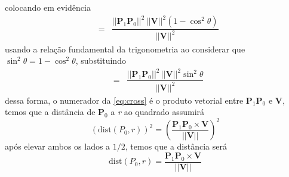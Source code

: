 \documentclass[a4paper, 12pt, brazilian]{article}
\newcommand{\vect}{\bm{P}_{1}\bm{P}_{0}}
\begin{document}
	colocando em evidência
	\begin{eqnarray}
		&=&\dfrac{||\vect||^{2}\,||\bm{V}||^{2}(1-\cos^{2}\theta)}{||\bm{V}||^{2}}
	\end{eqnarray}
	usando a relação fundamental da trigonometria ao considerar que $\sin^{2}\theta=1-\cos^{2}\theta$, substituindo
	\begin{eqnarray}
		\label{eq:cross}
		&=&\dfrac{||\vect||^{2}\,||\bm{V}||^{2}\sin^{2}\theta}{||\bm{V}||^{2}}
	\end{eqnarray}
	dessa forma, o numerador da \cref{eq:cross} é o produto vetorial entre $\vect$ e $\bm{V}$, temos que a distância de $\bm{P}_{0}$ a \textit{r} ao quadrado assumirá
	\begin{equation}
		(\textrm{dist}(P_{0},r))^{2}=\left(\dfrac{\vect\times\bm{V}}{||\bm{V}||}\right)^{\!\!2}
	\end{equation}
	após elevar ambos os lados a $1/2$, temos que a distância será
	\begin{equation}
		\textrm{dist}(P_{0},r)=\dfrac{\vect\times\bm{V}}{||\bm{V}||}
	\end{equation}
	 
	
	
\end{document}
